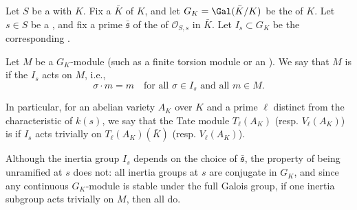 \begin{definition} \label{definition:unramified_galois_representation_for_a_dedekind_scheme_at_a_closed_point}
    Let $S$ be a  with  $K$. Fix a  $\bar{K}$ of $K$, and let $G_K = \Gal(\bar{K}/K)$ be the  of $K$. Let $s \in S$ be a , and fix a prime $\bar{\mathfrak{s}}$ of the  of $\mathcal{O}_{S, s}$ in $\bar{K}$. Let $I_s \subset G_K$ be the corresponding .

    Let $M$ be a  $G_K$-module (such as a finite torsion module or an ). We say that $M$ is  if the  $I_s$ acts  on $M$, i.e.,
    $$\sigma \cdot m = m \quad \text{for all } \sigma \in I_s \text{ and all } m \in M.$$

    In particular, for an abelian variety $A_K$ over $K$ and a prime $\ell$ distinct from the characteristic of $k(s)$, we say that the Tate module $T_\ell(A_K)$ (resp. $V_\ell(A_K)$) is  if $I_s$ acts trivially on $T_\ell(A_K)(\bar{K})$ (resp. $V_\ell(A_K)$).

    \begin{remark}
        Although the inertia group $I_s$ depends on the choice of $\bar{\mathfrak{s}}$, the property of being unramified at $s$ does not: all inertia groups at $s$ are conjugate in $G_K$, and since any continuous $G_K$-module is stable under the full Galois group, if one inertia subgroup acts trivially on $M$, then all do.
    \end{remark}
\end{definition}
